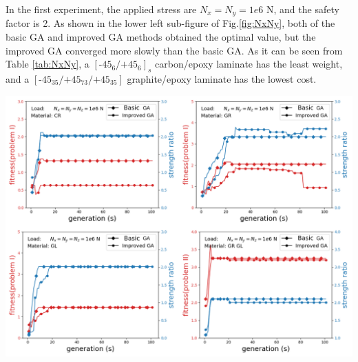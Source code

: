 \documentclass[smallextended]{svjour3}       %
\begin{document}
In the first experiment, the applied stress are $N_x=N_y=1e6$ N, and the safety
factor is 2.  As shown in the lower left sub-figure of Fig.\ref{fig:NxNy}, both
of the basic GA and improved GA methods obtained the optimal value, but the
improved GA converged more slowly than the basic GA. As it can be seen from
Table \ref{tab:NxNy}, a $[\text{-}45_{6}/\text{+}45_{6}]_s$ carbon/epoxy
laminate has the least weight, and a
$[\text{-}45_{35}/\text{+}45_{73}/\text{+}45_{35}]$ graphite/epoxy laminate
has the lowest cost.

\begin{center}
  \includegraphics[width=\linewidth]{A_laminate_design_images/NxNyNz.png}
  \label{fig:NxNyNz}
\end{center}
\end{document}
